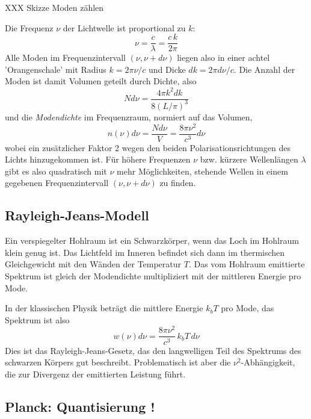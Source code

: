 \begin{marginfigure}
    \caption{XXX Skizze Moden zählen}
\end{marginfigure}

Die Frequenz $\nu$ der Lichtwelle ist proportional zu $k$:
\begin{equation}
    \nu = \frac{c}{\lambda} = \frac{c \, k}{2 \pi }
\end{equation}
Alle Moden  im  Frequenzintervall $(\nu, \nu+d\nu)$ liegen also in einer  achtel 'Orangenschale' mit Radius $k = 2 \pi \nu / c$  und Dicke $dk = 2 \pi d\nu / c$. Die Anzahl der Moden ist damit Volumen geteilt durch Dichte, also  
\begin{equation}
    N d\nu = \frac{4 \pi k^2 dk}{8 (L/\pi)^3} 
\end{equation}
und die \emph{Modendichte} im Frequenzraum, normiert auf das Volumen,
\begin{equation}
    n(\nu) d\nu = \frac{N d\nu}{V} = \frac{8 \pi \nu^2}{c^3} d\nu
\end{equation}
wobei ein zusätzlicher Faktor 2 wegen den beiden Polarisationsrichtungen des Lichts hinzugekommen ist. Für höhere Frequenzen $\nu$ bzw. kürzere Wellenlängen $\lambda$ gibt es also quadratisch mit $\nu$ mehr Möglichkeiten, stehende Wellen in einem gegebenen Frequenzintervall $(\nu, \nu+d\nu)$ zu finden. 

\subsection{Rayleigh-Jeans-Modell}

Ein verspiegelter Hohlraum ist ein Schwarzkörper, wenn das Loch im Hohlraum klein genug ist. Das Lichtfeld im Inneren befindet sich dann im thermischen Gleichgewicht mit den Wänden der Temperatur $T$. Das vom Hohlraum emittierte Spektrum ist gleich der Modendichte multipliziert mit der mittleren Energie pro Mode.

In der klassischen Physik beträgt die mittlere Energie $k_b T$ pro Mode, das Spektrum ist also 
\begin{equation}
    w(\nu) d\nu = \frac{8 \pi \nu^2}{c^3} \, k_b T \, d\nu
\end{equation}
Dies ist das Rayleigh-Jeans-Gesetz, das den langwelligen Teil des Spektrums des schwarzen Körpers gut beschreibt. Problematisch ist aber die $\nu^2$-Abhängigkeit, die zur Divergenz der emittierten Leistung führt.


\subsection{Planck: Quantisierung !}

